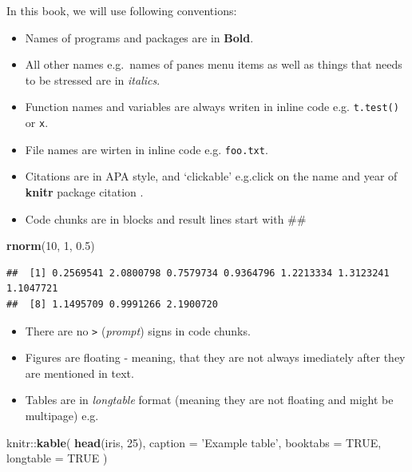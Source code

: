 \documentclass[]{book}
\newenvironment{Shaded}{\begin{snugshade}}{\end{snugshade}}
\newcommand{\KeywordTok}[1]{\textcolor[rgb]{0.12,0.11,0.11}{\textbf{#1}}}
\newcommand{\DataTypeTok}[1]{\textcolor[rgb]{0.00,0.34,0.68}{#1}}
\newcommand{\DecValTok}[1]{\textcolor[rgb]{0.69,0.50,0.00}{#1}}
\newcommand{\FloatTok}[1]{\textcolor[rgb]{0.69,0.50,0.00}{#1}}
\newcommand{\StringTok}[1]{\textcolor[rgb]{0.75,0.01,0.01}{#1}}
\newcommand{\OtherTok}[1]{\textcolor[rgb]{0.00,0.43,0.16}{#1}}
\newcommand{\OperatorTok}[1]{\textcolor[rgb]{0.12,0.11,0.11}{#1}}
\newcommand{\NormalTok}[1]{\textcolor[rgb]{0.12,0.11,0.11}{#1}}
\providecommand{\tightlist}{%
  \setlength{\itemsep}{0pt}\setlength{\parskip}{0pt}}
\theoremstyle{definition}
\theoremstyle{definition}
\theoremstyle{definition}
\theoremstyle{remark}
\begin{document}
In this book, we will use following conventions:

\begin{itemize}
\tightlist
\item
  Names of programs and packages are in \textbf{Bold}.
\item
  All other names e.g.~names of panes menu items as well as things that
  needs to be stressed are in \emph{italics}.
\item
  Function names and variables are always writen in inline code e.g.
  \texttt{t.test()} or \texttt{x}.
\item
  File names are wirten in inline code e.g. \texttt{foo.txt}.
\item
  Citations are in APA style, and `clickable' e.g.click on the name and
  year of \textbf{knitr} package citation \citep{xie2015}.
\item
  Code chunks are in blocks and result lines start with \#\#
\end{itemize}

\begin{Shaded}
\begin{Highlighting}[]
\KeywordTok{rnorm}\NormalTok{(}\DecValTok{10}\NormalTok{, }\DecValTok{1}\NormalTok{, }\FloatTok{0.5}\NormalTok{)}
\end{Highlighting}
\end{Shaded}

\begin{verbatim}
##  [1] 0.2569541 2.0800798 0.7579734 0.9364796 1.2213334 1.3123241 1.1047721
##  [8] 1.1495709 0.9991266 2.1900720
\end{verbatim}

\begin{itemize}
\tightlist
\item
  There are no \texttt{\textgreater{}} (\emph{prompt}) signs in code
  chunks.
\item
  Figures are floating - meaning, that they are not always imediately
  after they are mentioned in text.
\item
  Tables are in \emph{longtable} format (meaning they are not floating
  and might be multipage) e.g.
\end{itemize}

\begin{Shaded}
\begin{Highlighting}[]
\NormalTok{knitr}\OperatorTok{::}\KeywordTok{kable}\NormalTok{(}
  \KeywordTok{head}\NormalTok{(iris, }\DecValTok{25}\NormalTok{), }\DataTypeTok{caption =} \StringTok{'Example table'}\NormalTok{,}
  \DataTypeTok{booktabs =} \OtherTok{TRUE}\NormalTok{, }\DataTypeTok{longtable =} \OtherTok{TRUE}
\NormalTok{)}
\end{Highlighting}
\end{Shaded}
\end{document}
